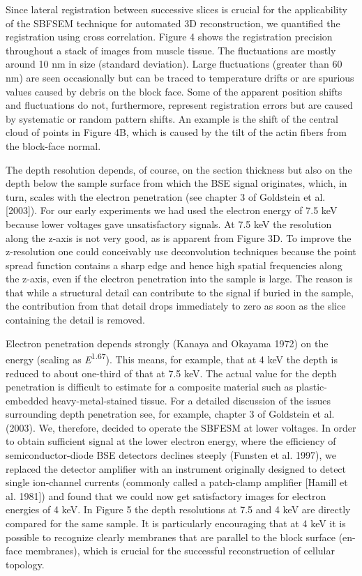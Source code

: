 \documentclass{article}
\begin{document}
Since lateral registration between successive slices is crucial for the applicability of the SBFSEM technique for automated 3D reconstruction, we quantified the registration using cross correlation. Figure 4 shows the registration precision throughout a stack of images from muscle tissue. The fluctuations are mostly around 10 nm in size (standard deviation). Large fluctuations (greater than 60 nm) are seen occasionally but can be traced to temperature drifts or are spurious values caused by debris on the block face. Some of the apparent position shifts and fluctuations do not, furthermore, represent registration errors but are caused by systematic or random pattern shifts. An example is the shift of the central cloud of points in Figure 4B, which is caused by the tilt of the actin fibers from the block-face normal.

The depth resolution depends, of course, on the section thickness but also on the depth below the sample surface from which the BSE signal originates, which, in turn, scales with the electron penetration (see chapter 3 of Goldstein et al. [2003]). For our early experiments we had used the electron energy of 7.5 keV because lower voltages gave unsatisfactory signals. At 7.5 keV the resolution along the z-axis is not very good, as is apparent from Figure 3D. To improve the z-resolution one could conceivably use deconvolution techniques because the point spread function contains a sharp edge and hence high spatial frequencies along the z-axis, even if the electron penetration into the sample is large. The reason is that while a structural detail can contribute to the signal if buried in the sample, the contribution from that detail drops immediately to zero as soon as the slice containing the detail is removed.

Electron penetration depends strongly (Kanaya and Okayama 1972) on the energy (scaling as \emph{E}\textsuperscript{1.67}). This means, for example, that at 4 keV the depth is reduced to about one-third of that at 7.5 keV. The actual value for the depth penetration is difficult to estimate for a composite material such as plastic-embedded heavy-metal-stained tissue. For a detailed discussion of the issues surrounding depth penetration see, for example, chapter 3 of Goldstein et al. (2003). We, therefore, decided to operate the SBFESM at lower voltages. In order to obtain sufficient signal at the lower electron energy, where the efficiency of semiconductor-diode BSE detectors declines steeply (Funsten et al. 1997), we replaced the detector amplifier with an instrument originally designed to detect single ion-channel currents (commonly called a patch-clamp amplifier [Hamill et al. 1981]) and found that we could now get satisfactory images for electron energies of 4 keV. In Figure 5 the depth resolutions at 7.5 and 4 keV are directly compared for the same sample. It is particularly encouraging that at 4 keV it is possible to recognize clearly membranes that are parallel to the block surface (en-face membranes), which is crucial for the successful reconstruction of cellular topology.
\end{document}
